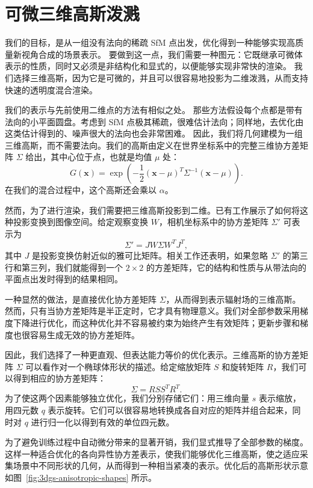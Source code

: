 \section{可微三维高斯泼溅}

我们的目标，是从一组没有法向的稀疏 SfM 点出发，优化得到一种能够实现高质量新视角合成的场景表示。
要做到这一点，我们需要一种图元：它既继承可微体表示的性质，同时又必须是非结构化和显式的，以便能够实现非常快的渲染。
我们选择三维高斯，因为它是可微的，并且可以很容易地投影为二维泼溅，从而支持快速的透明度混合渲染。

我们的表示与先前使用二维点的方法有相似之处。
那些方法假设每个点都是带有法向的小平面圆盘。考虑到 SfM 点极其稀疏，很难估计法向；同样地，去优化由这类估计得到的、噪声很大的法向也会非常困难。
因此，我们将几何建模为一组三维高斯，而不需要法向。我们的高斯由定义在世界坐标系中的完整三维协方差矩阵 \(\Sigma\) 给出，其中心位于点，也就是均值 \(\mu\) 处：
\[
G(\mathbf{x})=\exp\!\left(-\frac{1}{2}(\mathbf{x}-\mu)^{T}\Sigma^{-1}(\mathbf{x}-\mu)\right).
\]
在我们的混合过程中，这个高斯还会乘以 \(\alpha\)。

然而，为了进行渲染，我们需要把三维高斯投影到二维。已有工作展示了如何将这种投影变换到图像空间。给定观察变换 \(W\)，相机坐标系中的协方差矩阵 \(\Sigma'\) 可表示为
\[
\Sigma' = J W \Sigma W^{T} J^{T},
\]
其中 \(J\) 是投影变换仿射近似的雅可比矩阵。相关工作还表明，如果忽略 \(\Sigma'\) 的第三行和第三列，我们就能得到一个 \(2\times2\) 的方差矩阵，它的结构和性质与从带法向的平面点出发时得到的结果相同。

一种显然的做法，是直接优化协方差矩阵 \(\Sigma\)，从而得到表示辐射场的三维高斯。然而，只有当协方差矩阵是半正定时，它才具有物理意义。我们对全部参数采用梯度下降进行优化，而这种优化并不容易被约束为始终产生有效矩阵；更新步骤和梯度也很容易生成无效的协方差矩阵。

因此，我们选择了一种更直观、但表达能力等价的优化表示。三维高斯的协方差矩阵 \(\Sigma\) 可以看作对一个椭球体形状的描述。给定缩放矩阵 \(S\) 和旋转矩阵 \(R\)，我们可以得到相应的协方差矩阵：
\[
\Sigma = R S S^{T} R^{T}.
\]
为了使这两个因素能够独立优化，我们分别存储它们：用三维向量 \(s\) 表示缩放，用四元数 \(q\) 表示旋转。它们可以很容易地转换成各自对应的矩阵并组合起来，同时对 \(q\) 进行归一化以得到有效的单位四元数。

为了避免训练过程中自动微分带来的显著开销，我们显式推导了全部参数的梯度。这样一种适合优化的各向异性协方差表示，使我们能够优化三维高斯，使之适应采集场景中不同形状的几何，从而得到一种相当紧凑的表示。优化后的高斯形状示意如图~\ref{fig:3dgs-anisotropic-shapes} 所示。

